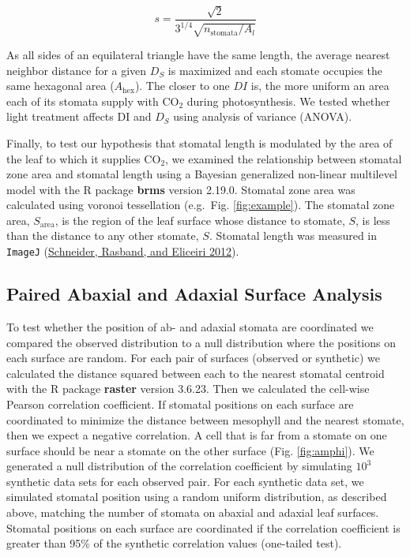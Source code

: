 \documentclass[12pt,halfline,a4paper,]{ouparticle}
\begin{document}
\begin{equation}\label{eq:eq2}
  s = \frac{\sqrt{2}} {3^{1/4} \sqrt{n_\text{stomata} / A_l}}
\end{equation}

As all sides of an equilateral triangle have the same length, the
average nearest neighbor distance for a given \(D_S\) is maximized and
each stomate occupies the same hexagonal area (\(A_\text{hex}\)). The
closer to one \(DI\) is, the more uniform an area each of its stomata
supply with CO\(_2\) during photosynthesis. We tested whether light
treatment affects \(\mathrm{DI}\) and \(D_S\) using analysis of variance
(ANOVA).

Finally, to test our hypothesis that stomatal length is modulated by the
area of the leaf to which it supplies CO\(_2\), we examined the
relationship between stomatal zone area and stomatal length using a
Bayesian generalized non-linear multilevel model with the R package
\textbf{brms} version 2.19.0. Stomatal zone area was calculated using
voronoi tessellation (e.g.~Fig. \ref{fig:example}). The stomatal zone
area, \(S_\text{area}\), is the region of the leaf surface whose
distance to stomate, \(S\), is less than the distance to any other
stomate, \(S\). Stomatal length was measured in \texttt{ImageJ}
(\protect\hyperlink{ref-schneider_nih_2012}{Schneider, Rasband, and
Eliceiri 2012}).

\hypertarget{paired-abaxial-and-adaxial-surface-analysis}{%
\subsection{Paired Abaxial and Adaxial Surface
Analysis}\label{paired-abaxial-and-adaxial-surface-analysis}}

To test whether the position of ab- and adaxial stomata are coordinated
we compared the observed distribution to a null distribution where the
positions on each surface are random. For each pair of surfaces
(observed or synthetic) we calculated the distance squared between each
to the nearest stomatal centroid with the R package \textbf{raster}
version 3.6.23. Then we calculated the cell-wise Pearson correlation
coefficient. If stomatal positions on each surface are coordinated to
minimize the distance between mesophyll and the nearest stomate, then we
expect a negative correlation. A cell that is far from a stomate on one
surface should be near a stomate on the other surface (Fig.
\ref{fig:amphi}). We generated a null distribution of the correlation
coefficient by simulating \(10^3\) synthetic data sets for each observed
pair. For each synthetic data set, we simulated stomatal position using
a random uniform distribution, as described above, matching the number
of stomata on abaxial and adaxial leaf surfaces. Stomatal positions on
each surface are coordinated if the correlation coefficient is greater
than 95\% of the synthetic correlation values (one-tailed test).
\end{document}
